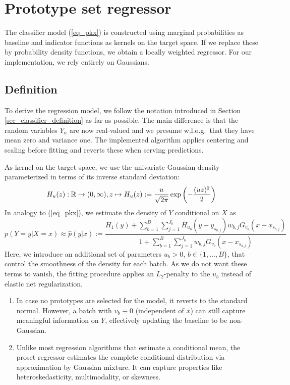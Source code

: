\chapter{Prototype set regressor}
\label{ch_regressors}
%
The classifier model (\ref{eq_pkx}) is constructed using marginal probabilities as baseline and indicator functions as kernels on the target space.
If we replace these by probability density functions, we obtain a locally weighted regressor.
For our implementation, we rely entirely on Gaussians.
%
\section{Definition}
\label{sec_regressor_definition}
%
To derive the regression model, we follow the notation introduced in Section \ref{sec_classifier_definition} as far as possible.
The main difference is that the random variables $Y_n$ are now real-valued and we presume w.l.o.g.\ that they have mean zero and variance one.
The implemented algorithm applies centering and scaling before fitting and reverts these when serving predictions.\par
%
As kernel on the target space, we use the univariate Gaussian density parameterized in terms of its inverse standard deviation:
%
\begin{equation}
H_u(z):\mathbb{R}\rightarrow(0,\infty),z\mapsto H_u(z):=\frac{u}{\sqrt{2\pi}}\exp\left(-\frac{(uz)^2}{2}\right)\label{eq_kernel_2}
\end{equation}
%
In analogy to (\ref{eq_pkx}), we estimate the density of $Y$ conditional on $X$ as
%
\begin{equation}
p(Y=y|X=x)\approx\hat{p}(y|x):=
\frac{H_1(y)+\sum_{b=1}^B\sum_{j=1}^{J_b}H_{u_b}(y-y_{s_{b,j}})w_{b,j}G_{v_b}(x-x_{s_{b,j}})}
{1+\sum_{b=1}^B\sum_{j=1}^{J_b}w_{b,j}G_{v_b}(x-x_{s_{b,j}})}
\label{eq_pyx}
\end{equation}
%
Here, we introduce an additional set of parameters $u_b>0$, $b\in\{1,\dots,B\}$, that control the smoothness of the density for each batch.
As we do not want these terms to vanish, the fitting procedure applies an $L_2$-penalty to the $u_b$ instead of elastic net regularization.
%
\begin{remark}
\begin{enumerate}
\item In case no prototypes are selected for the model, it reverts to the standard normal. 
However, a batch with $v_b\equiv0$ (independent of $x$) can still capture meaningful information on $Y$, effectively updating the baseline to be non-Gaussian.
%
\item Unlike most regression algorithms that estimate a conditional mean, the proset regressor estimates the complete conditional distribution via approximation by Gaussian mixture.
It can capture properties like heteroskedasticity, multimodality, or skewness.
\end{enumerate}
\end{remark}
